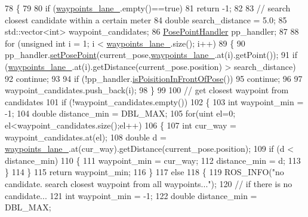 \begin{DoxyCode}
78 \{
79 
80   \textcolor{keywordflow}{if} (\hyperlink{class_lane_handler_ac65a0139b3900a7c8dc3fe49d7a684f3}{waypoints\_lane\_}.empty()==\textcolor{keyword}{true})
81     \textcolor{keywordflow}{return} -1;
82 
83   \textcolor{comment}{// search closest candidate within a certain meter}
84   \textcolor{keywordtype}{double} search\_distance = 5.0;
85   std::vector<int> waypoint\_candidates;
86   \hyperlink{class_pose_point_handler}{PosePointHandler} pp\_handler;
87 
88   \textcolor{keywordflow}{for} (\textcolor{keywordtype}{unsigned} \textcolor{keywordtype}{int} i = 1; i < \hyperlink{class_lane_handler_ac65a0139b3900a7c8dc3fe49d7a684f3}{waypoints\_lane\_}.size(); i++)
89   \{
90     pp\_handler.\hyperlink{class_pose_point_handler_a6d037671a1c93d9d51a7b0e40eacd3fa}{setPosePoint}(current\_pose,\hyperlink{class_lane_handler_ac65a0139b3900a7c8dc3fe49d7a684f3}{waypoints\_lane\_}.at(i).getPoint());
91     \textcolor{keywordflow}{if} (\hyperlink{class_lane_handler_ac65a0139b3900a7c8dc3fe49d7a684f3}{waypoints\_lane\_}.at(i).getDistance(current\_pose.position) > search\_distance)
92       \textcolor{keywordflow}{continue};
93 
94     \textcolor{keywordflow}{if} (!pp\_handler.\hyperlink{class_pose_point_handler_a030d4318ea42d398798b675624ebd07b}{isPoisitionInFrontOfPose}())
95       \textcolor{keywordflow}{continue};
96 
97     waypoint\_candidates.push\_back(i);
98   \}
99 
100   \textcolor{comment}{// get closest waypoint from candidates}
101   \textcolor{keywordflow}{if} (!waypoint\_candidates.empty())
102   \{
103     \textcolor{keywordtype}{int} waypoint\_min = -1;
104     \textcolor{keywordtype}{double} distance\_min = DBL\_MAX;
105     \textcolor{keywordflow}{for}(uint el=0; el<waypoint\_candidates.size();el++)
106     \{
107       \textcolor{keywordtype}{int} cur\_way = waypoint\_candidates.at(el);
108       \textcolor{keywordtype}{double} d = \hyperlink{class_lane_handler_ac65a0139b3900a7c8dc3fe49d7a684f3}{waypoints\_lane\_}.at(cur\_way).getDistance(current\_pose.position);
109       \textcolor{keywordflow}{if} (d < distance\_min)
110       \{
111         waypoint\_min = cur\_way;
112         distance\_min = d;
113       \}
114     \}
115     \textcolor{keywordflow}{return} waypoint\_min;
116   \}
117   \textcolor{keywordflow}{else}
118   \{
119     ROS\_INFO(\textcolor{stringliteral}{"no candidate. search closest waypoint from all waypoints..."});
120     \textcolor{comment}{// if there is no candidate...}
121     \textcolor{keywordtype}{int} waypoint\_min = -1;
122     \textcolor{keywordtype}{double} distance\_min = DBL\_MAX;

\end{DoxyCode}
